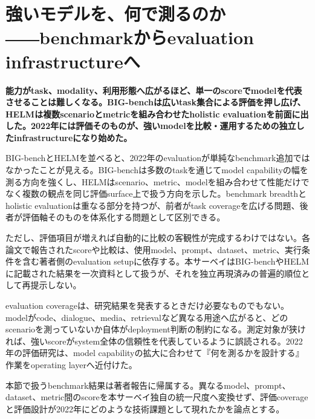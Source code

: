 \section{強いモデルを、何で測るのか――benchmarkからevaluation infrastructureへ}
\label{pkg:evaluation-layer}
\noindent\textbf{能力がtask、modality、利用形態へ広がるほど、単一のscoreでmodelを代表させることは難しくなる。BIG-benchは広いtask集合による評価を押し広げ、HELMは複数scenarioとmetricを組み合わせたholistic evaluationを前面に出した。2022年には評価そのものが、強いmodelを比較・運用するための独立したinfrastructureになり始めた。}\autocite{src-1e362767e63c,src-f02969e400b0}

BIG-benchとHELMを並べると、2022年のevaluationが単純なbenchmark追加ではなかったことが見える。BIG-benchは多数のtaskを通じてmodel capabilityの幅を測る方向を強くし、HELMはscenario、metric、modelを組み合わせて性能だけでなく複数の観点を同じ評価surface上で扱う方向を示した。benchmark breadthとholistic evaluationは重なる部分を持つが、前者がtask coverageを広げる問題、後者が評価軸そのものを体系化する問題として区別できる。\autocite{src-1e362767e63c,src-f02969e400b0}


ただし、評価項目が増えれば自動的に比較の客観性が完成するわけではない。各論文で報告されたscoreや比較は、使用model、prompt、dataset、metric、実行条件を含む著者側のevaluation setupに依存する。本サーベイはBIG-benchやHELMに記載された結果を一次資料として扱うが、それを独立再現済みの普遍的順位として再提示しない。\autocite{src-1e362767e63c,src-f02969e400b0}


evaluation coverageは、研究結果を発表するときだけ必要なものでもない。modelがcode、dialogue、media、retrievalなど異なる用途へ広がると、どのscenarioを測っていないか自体がdeployment判断の制約になる。測定対象が狭ければ、強いscoreがsystem全体の信頼性を代表しているように誤読される。2022年の評価研究は、model capabilityの拡大に合わせて『何を測るかを設計する』作業をoperating layerへ近付けた。\autocite{src-1e362767e63c,src-f02969e400b0}


\begin{claimboundary}
本節で扱うbenchmark結果は著者報告に帰属する。異なるmodel、prompt、dataset、metric間のscoreを本サーベイ独自の統一尺度へ変換せず、評価coverageと評価設計が2022年にどのような技術課題として現れたかを論点とする。\autocite{src-1e362767e63c,src-f02969e400b0}
\end{claimboundary}
